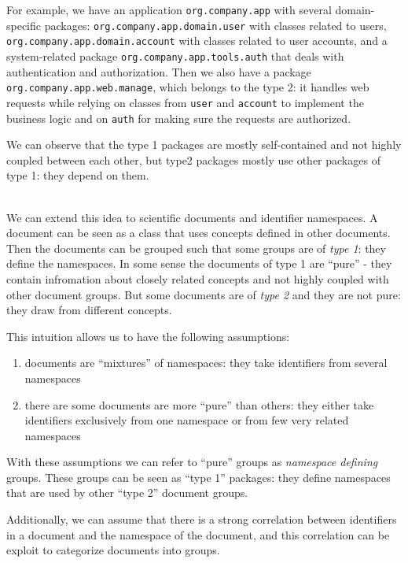 For example, we have an application \verb|org.company.app|
with several domain-specific packages: \verb|org.company.app.domain.user|
with classes related to users, \verb|org.company.app.domain.account|
with classes related to user accounts, and a system-related package
\verb|org.company.app.tools.auth| that deals with authentication and
authorization. Then we also have a package \verb|org.company.app.web.manage|,
which belongs to the type 2: it handles web requests
while relying on classes from \verb|user| and \verb|account| to
implement the business logic and on \verb|auth| for making sure the
requests are authorized.

We can observe that the type 1 packages are mostly self-contained
and not highly coupled between each other,
but type2 packages mostly use other packages of type 1: they
depend on them.

\ \\

We can extend this idea to scientific documents and identifier
namespaces. A document can be seen as a class that uses concepts defined
in other documents. Then the documents can be grouped such that
some groups are of \emph{type 1}: they define the namespaces. In some
sense the documents of type 1 are ``pure'' - they contain infromation
about closely related concepts and not highly coupled
with other document groups. But some documents are of \emph{type 2} and they
are not pure: they draw from different concepts.


This intuition allows us to have the following assumptions:

\begin{enumerate}
 \item documents are ``mixtures'' of namespaces: they take identifiers from several namespaces
 \item there are some documents are more ``pure'' than others: they either take identifiers exclusively from one namespace or from few very related namespaces
\end{enumerate}


With these assumptions we can refer to ``pure'' groups as
\emph{namespace defining} groups. These groups can be seen as
``type 1'' packages: they define namespaces that are used by other
``type 2'' document groups.


Additionally, we can assume that there is a strong correlation
between identifiers in a document and the namespace of the document,
and this correlation can be exploit to categorize
documents into groups.


